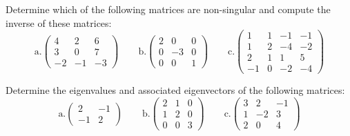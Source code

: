 \documentclass[12pt, answers]{exam}
\begin{document}
\begin{questions}

\addpoints
\question[10] 
Determine which of the following matrices are non-singular and compute the inverse of these matrices:
%
\begin{equation}
\text{a.} \begin{pmatrix}
   4 &  2 &  6 \\
   3 &  0 &  7 \\
  -2 & -1 & -3
\end{pmatrix} \qquad
%
\text{b.} \begin{pmatrix}
  2 &  0 & 0 \\
  0 & -3 & 0 \\
  0 &  0 & 1
\end{pmatrix} \qquad 
\text{c.} \begin{pmatrix}
  1  & 1 & -1 & -1 \\
  1  & 2 & -4 & -2 \\
  2  & 1 &  1 & 5 \\
  -1 & 0 & -2 & -4
\end{pmatrix} \nonumber
\end{equation}


\vspace*{3em}
\addpoints
\question[10] Determine the eigenvalues and associated eigenvectors of the following matrices:
%
\begin{equation}
\text{a.} \begin{pmatrix}
   2  & -1 \\
   -1 &  2  
\end{pmatrix} \qquad
%
\text{b.} \begin{pmatrix}
  2 &  1 & 0 \\
  1 &  2 & 0 \\
  0 &  0 & 3
\end{pmatrix} \qquad 
\text{c.} \begin{pmatrix}
  3  &  2 & -1 \\
  1  & -2 &  3 \\
  2  &  0 &  4
\end{pmatrix} \nonumber
\end{equation}




\end{questions}
\end{document}
